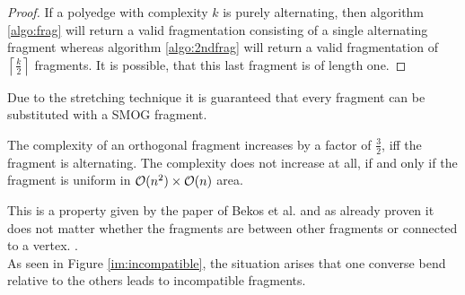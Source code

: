 \begin{proof}
	If a polyedge with complexity $k$ is purely alternating, then algorithm \ref{algo:frag} will return a valid fragmentation consisting of a single alternating fragment whereas algorithm \ref{algo:2ndfrag} will return a valid fragmentation of $\left\lceil\frac{k}{2}\right\rceil$ fragments. It is possible, that this last fragment is of length one.%
	
\end{proof}
Due to the stretching technique it is guaranteed that every fragment can be substituted with a SMOG fragment.
\begin{lemma}
	The complexity of an orthogonal fragment increases by a factor of $\frac{3}{2}$, iff the fragment is alternating. The complexity does not increase at all, if and only if the fragment is uniform in $\mathcal{O}(n^2)\times\mathcal{O}(n)$ area.\label{lem:edgebounds}
\end{lemma}
This is a property given by the paper of Bekos et al. and as already proven it does not matter whether the fragments are between other fragments or connected to a vertex. \cite[Figure 6, p. 584]{SMOG}.\\
As seen in Figure \ref{im:incompatible}, the situation arises that one converse bend relative to the others leads to incompatible fragments.
